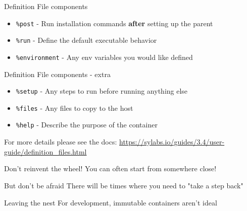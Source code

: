 \documentclass[10pt]{beamer}              %
\begin{document}
\begin{frame}{Definition File components}
\begin{itemize}
    \item \texttt{\%post} - Run installation commands \textbf{after} setting up the parent
    \item \texttt{\%run} - Define the default executable behavior
    \item \texttt{\%environment} - Any env variables you would like defined
\end{itemize}
    
\end{frame}{}

\begin{frame}{Definition File components - extra}
\begin{itemize}
    \item \texttt{\%setup} - Any steps to run before running anything else
    \item \texttt{\%files} - Any files to copy to the host
    \item \texttt{\%help} - Describe the purpose of the container
\end{itemize}
    
    For more details please see the docs: \url{https://sylabs.io/guides/3.4/user-guide/definition_files.html}
\end{frame}{}

\begin{frame}{Don't reinvent the wheel!}
    You can often start from somewhere close!
    \noindent\makebox[\linewidth]{\rule{\paperwidth}{0.4pt}}
\end{frame}

\begin{frame}{But don't be afraid}
    There will be times where you need to "take a step back"
    \noindent\makebox[\linewidth]{\rule{\paperwidth}{0.4pt}}

\end{frame}

\begin{frame}{Leaving the nest}
    For development, immutable containers aren't ideal
    \noindent\makebox[\linewidth]{\rule{\paperwidth}{0.4pt}}
    
\end{frame}
\end{document}
